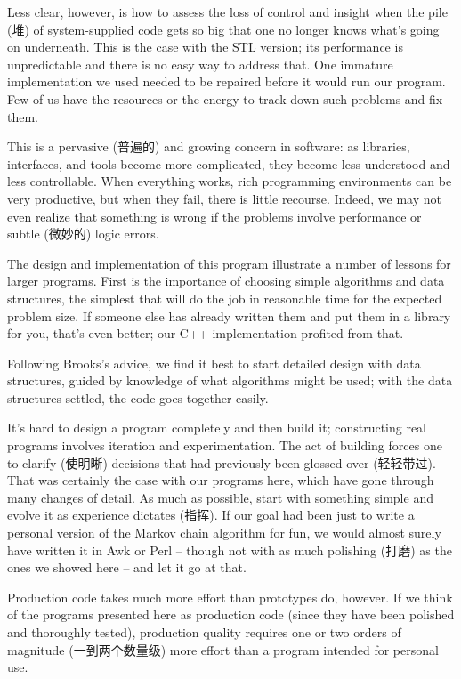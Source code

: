 Less clear, however, is how to assess the loss of control and insight when
the pile (堆) of system-supplied code gets so big that one no longer knows
what's going on underneath. This is the case with the STL version; its
performance is unpredictable and there is no easy way to address that. One
immature implementation we used needed to be repaired before it would run
our program. Few of us have the resources or the energy to track down such
problems and fix them.

This is a pervasive (普遍的) and growing concern in software: as libraries,
interfaces, and tools become more complicated, they become less understood
and less controllable.  When everything works, rich programming
environments can be very productive, but when they fail, there is little
recourse. Indeed, we may not even realize that something is wrong if the
problems involve performance or subtle (微妙的) logic errors.

The design and implementation of this program illustrate a number of
lessons for larger programs. First is the importance of choosing simple
algorithms and data structures, the simplest that will do the job in
reasonable time for the expected problem size. If someone else has already
written them and put them in a library for you, that's even better; our C++
implementation profited from that.

Following Brooks's advice, we find it best to start detailed design with
data structures, guided by knowledge of what algorithms might be used; with
the data structures settled, the code goes together easily.

It's hard to design a program completely and then build it; constructing
real programs involves iteration and experimentation. The act of building
forces one to clarify (使明晰) decisions that had previously been glossed
over (轻轻带过). That was certainly the case with our programs here, which
have gone through many changes of detail. As much as possible, start with
something simple and evolve it as experience dictates (指挥).  If our goal
had been just to write a personal version of the Markov chain algorithm for
fun, we would almost surely have written it in Awk or Perl -- though not
with as much polishing (打磨) as the ones we showed here -- and let it go
at that.

Production code takes much more effort than prototypes do, however. If we
think of the programs presented here as production code (since they have
been polished and thoroughly tested), production quality requires one or
two orders of magnitude (一到两个数量级) more effort than a program
intended for personal use.

